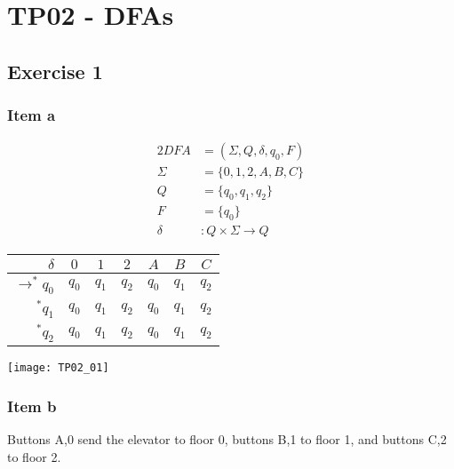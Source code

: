 \setcounter{section}{1}
\section{TP02 - DFAs}
{
\renewcommand{\thesubsubsection}{\thesubsection\alph{subsubsection}}
\subsection{Exercise 1}
\subsubsection{Item a}
\begin{center}
	\begin{minipage}[c]{0.5\textwidth}
		\begin{alignat*}{2}
			DFA    &= (\Sigma, Q, \delta, q_0, F)\\
			\Sigma &= \{0,1,2,A,B,C\}\\
			Q      &= \{q_0,q_1,q_2\}\\
			F      &= \{q_0\}\\
			\delta &\colon Q \times \Sigma \rightarrow Q
		\end{alignat*}
		\begin{center}
		\begin{tabular}{ r | c c c c c c}
 			$\delta              $ & $0  $ & $1  $ & $2  $ & $A  $ & $B  $ & $C  $ \\ \hline
 			$\rightarrow^\ast q_0$ & $q_0$ & $q_1$ & $q_2$ & $q_0$ & $q_1$ & $q_2$ \\  
 			$           ^\ast q_1$ & $q_0$ & $q_1$ & $q_2$ & $q_0$ & $q_1$ & $q_2$ \\
 			$           ^\ast q_2$ & $q_0$ & $q_1$ & $q_2$ & $q_0$ & $q_1$ & $q_2$    
		\end{tabular}
		\end{center}
	\end{minipage}
	\begin{minipage}[c]{0.4\textwidth}
		\texttt{[image: TP02\_01]}
	\end{minipage}
\end{center}
\subsubsection{Item b}
Buttons A,0 send the elevator to floor 0, buttons B,1 to floor 1, and buttons C,2 to floor 2.
}
